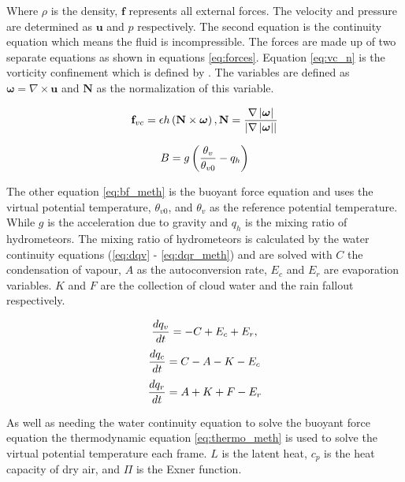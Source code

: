 Where $\rho$ is the density, $\mathbf{f}$ represents all external forces.
The velocity and pressure are determined as $\mathbf{u}$ and $p$ respectively.
The second equation is the continuity equation which means the fluid is incompressible.
The forces are made up of two separate equations as shown in equations \ref{eq:forces}.
Equation \ref{eq:vc_n} is the vorticity confinement which is defined by \citet{HarrisEtAl03}.
The variables are defined as $\boldsymbol{\omega} = \nabla\times\mathbf{u}$ and $\mathbf{N}$ as the normalization of this variable. 

\begin{equation} \label{eq:vc_n}
  \centering
  \mathbf{f}_{vc} = \epsilon h\left(\mathbf{N}\times\boldsymbol{\omega}\right), \mathbf{N} = \frac{\nabla\left|\boldsymbol{\omega}\right|}{\left|\nabla\left|\boldsymbol{\omega}\right|\right|}
\end{equation}

\begin{equation} \label{eq:bf_meth}
  \centering
  B = g\left(\frac{\theta_{v}}{\theta_{v0}} - q_{h}\right)
\end{equation}

The other equation \ref{eq:bf_meth} is the buoyant force equation and uses the virtual potential temperature, $\theta_{v0}$, and $\theta_{v}$ as the reference potential temperature.
While $g$ is the acceleration due to gravity and $q_{h}$ is the mixing ratio of hydrometeors.
The mixing ratio of hydrometeors is calculated by the water continuity equations (\ref{eq:dqv} - \ref{eq:dqr_meth}) and are solved with $C$ the condensation of vapour, $A$ as the autoconversion rate, $E_{c}$ and $E_{r}$ are evaporation variables.
$K$ and $F$ are the collection of cloud water and the rain fallout respectively.

\begin{equation} \label{eq:dqv_meth}
  \centering
  \frac{dq_{v}}{dt} = - C + E_{c} + E_{r}, 
\end{equation}
\begin{equation} \label{eq:dqc_meth}
  \centering
  \frac{dq_{c}}{dt} = C - A - K - E_{c}
\end{equation}
\begin{equation} \label{eq:dqr_meth}
  \centering
  \frac{dq_{r}}{dt} = A + K + F - E_{r}
\end{equation}

As well as needing the water continuity equation to solve the buoyant force equation the thermodynamic equation \ref{eq:thermo_meth} is used to solve the virtual potential temperature each frame. $L$ is the latent heat, $c_{p}$ is the heat capacity of dry air, and $\Pi$ is the Exner function. 

